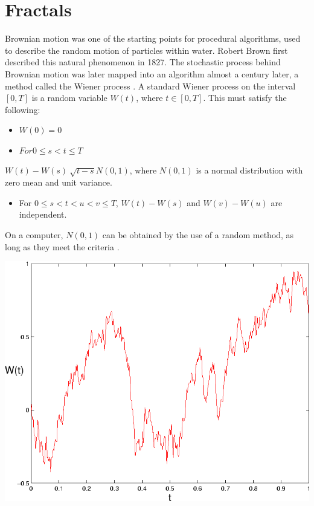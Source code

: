 \documentclass[10pt]{report}
\begin{document}
		\section{Fractals}
		Brownian motion was one of the starting points for procedural algorithms, used to describe the random motion of particles within water. Robert Brown first described this natural phenomenon in 1827. The stochastic process behind Brownian motion was later mapped into an algorithm almost a century later, a method called the Wiener process \cite{inbook}. A standard Wiener process on the interval \([0,T]\) is a random variable \(W(t)\), where \(t \in [0,T]\). This must satisfy the following:
		
		\begin{itemize}
			\item \(W(0) = 0\)
			\item \(For 0 \leq s < t \leq T\) 
		\end{itemize}
		
		\(W(t) - W(s) ~ \sqrt{t - s} N(0,1)\), where \(N(0,1)\) is a normal distribution with zero mean and unit variance. 
		
		\begin{itemize}
			\item For \( 0 \leq s < t < u < v \leq T\), \(W(t) - W(s)\) and \(W(v) - W(u)\) are independent.
		\end{itemize}
		
		On a computer, \(N(0,1)\) can be obtained by the use of a random method, as long as they meet the criteria \cite{wiener-process}. 
		
		\begin{minipage}{\textwidth}
			\centering
			\includegraphics[scale=.3]{wiener-process}
			\label{fig:wiener-proc}
		\end{minipage} 
		
\end{document}
